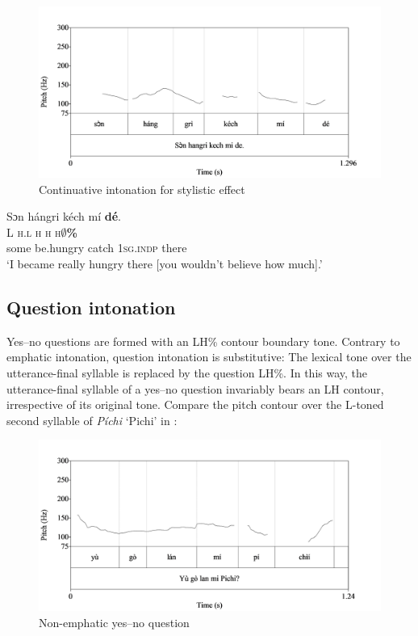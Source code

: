 \begin{figure}
\caption{Continuative intonation for stylistic effect}
\label{fig:key:3.42}
\includegraphics[height=.3\textheight]{figures/yakpomod-img44.png}
\end{figure}

  
 


\ea%
    \label{ex:key:95}
    \glll   Sɔn    hángri    kéch  mí    \textbf{dé}.\\
L    \textsc{h.l}      \textsc{h}    \textsc{h}    \textsc{h}\textbf{\textsc{${\emptyset}$}}\textbf{\textsc{\%}}\\
some  be.hungry  catch  \textsc{1sg.indp}  there\\
\glt ‘I became really hungry there [you wouldn’t believe how much].’
\z

\subsection{Question intonation}\label{sec:3.4.5}

Yes–no questions are formed with an LH\% contour boundary tone. Contrary to emphatic intonation, question intonation is substitutive: The lexical tone over the utterance-final syllable is replaced by the question LH\%. In this way, the utterance-final syllable of a yes–no question invariably bears an LH contour, irrespective of its original tone. Compare the pitch contour over the L-toned second syllable of \textit{Píchi} ‘Pichi’ in : 

\begin{figure}
\caption{Non-emphatic yes–no question}
\label{fig:key:3.43}
\includegraphics[height=.3\textheight]{figures/yakpomod-img45.png}
\end{figure}

